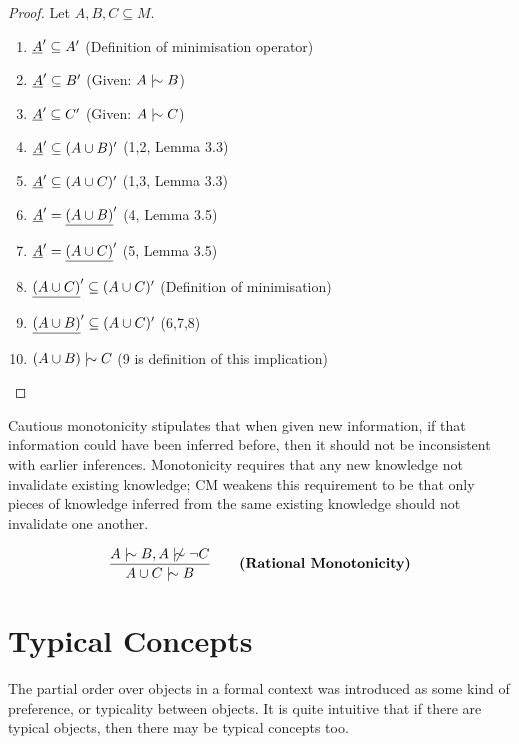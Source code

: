 \documentclass[11pt]{article}
\begin{document}
\begin{proof}
  Let $A, B, C \subseteq M$.
  \begin{enumerate}
    \item $\underline{A}' \subseteq A'$ \hfill (Definition of minimisation operator)
    \item $\underline{A}' \subseteq B'$ \hfill (Given: $A \twiddle B$)
    \item $\underline{A}' \subseteq C'$ \hfill (Given: $A \twiddle C$)
    \item $\underline{A}' \subseteq (A \cup B)' $ \hfill (1,2, Lemma 3.3)
    \item $\underline{A}' \subseteq (A \cup C)' $ \hfill (1,3, Lemma 3.3)
    \item $\underline{A}' = \underline{(A\cup B)}'$ \hfill (4, Lemma 3.5)
    \item $\underline{A}' = \underline{(A \cup C)}'$ \hfill (5, Lemma 3.5)
    \item $\underline{(A\cup C)}' \subseteq (A \cup C)'$ \hfill (Definition of minimisation)
    \item $\underline{(A\cup B)}' \subseteq (A\cup C)'$ \hfill (6,7,8)
    \item $(A\cup B) \twiddle C$ \hfill (9 is definition of this implication)
  \end{enumerate}
\end{proof}

\begin{remark}
  Cautious monotonicity stipulates that when given new information, if that information could have been inferred before, then it should not be inconsistent with earlier inferences. Monotonicity requires that any new knowledge not invalidate existing knowledge; CM weakens this requirement to be that only pieces of knowledge inferred from the same existing knowledge should not invalidate one another.
\end{remark}

\begin{equation}
  \frac{A \twiddle B, A \ntwiddle \neg C}{A \cup C \twiddle B} \qquad \textbf{(Rational Monotonicity)}
\end{equation}

\section{Typical Concepts}

The partial order over objects in a formal context was introduced as some kind of preference, or typicality between objects. It is quite intuitive that if there are typical objects, then there may be typical concepts too.
\end{document}
